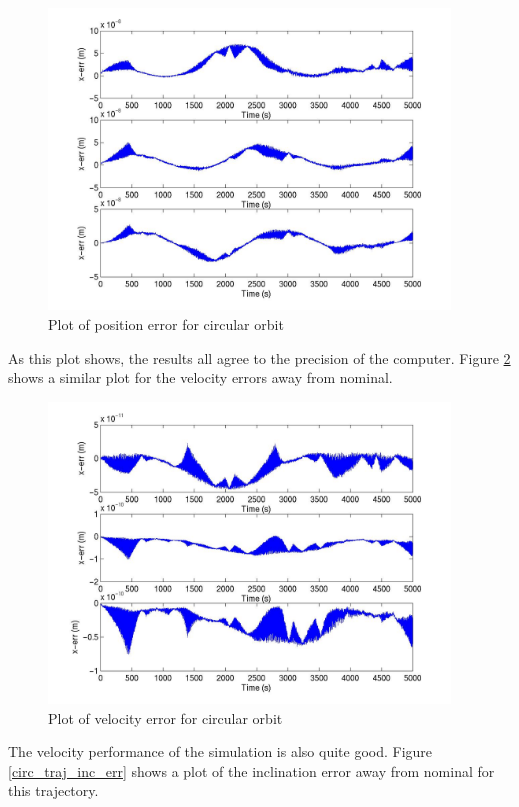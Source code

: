 \begin{description}
\begin{figure}[h]
\begin{center}
\includegraphics[height=80mm]{JPGfiles/circular_pos_err.jpg}
\caption{Plot of position error for circular orbit}
\label{circ_traj_pos_err}
\end{center}
\end{figure}

As this plot shows, the results all agree to the precision of the computer.
Figure \ref{circ_traj_vel_err} shows a similar plot for the velocity errors
away from nominal.

\begin{figure}[h]
\begin{center}
\includegraphics[height=80mm]{JPGfiles/circular_vel_err.jpg}
\caption{Plot of velocity error for circular orbit}
\label{circ_traj_vel_err}
\end{center}
\end{figure}

The velocity performance of the simulation is also quite good.  Figure
\ref{circ_traj_inc_err} shows a plot of the inclination error away from nominal
for this trajectory.


\end{description}
